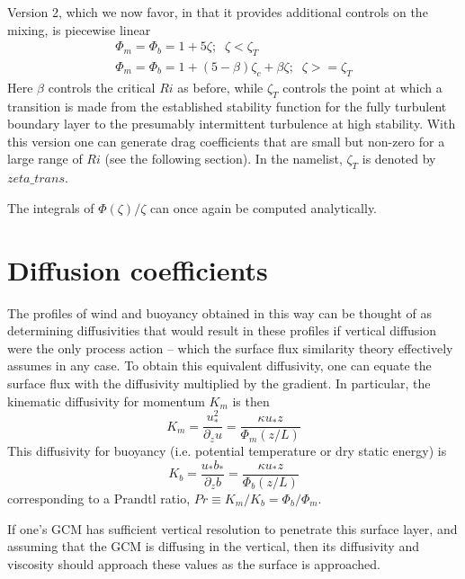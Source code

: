 \documentclass[12pt, letterpaper]{article}
\begin{document}
Version 2, which we now favor, in that it provides additional controls
on the mixing, is piecewise linear
\begin{gather}
  \Phi_m = \Phi_b = 1+5\zeta;\;\; \zeta < \zeta_T \\
  \Phi_m = \Phi_b = 1+(5-\beta)\zeta_c+\beta\zeta;\;\; \zeta >= \zeta_T
\end{gather}
Here $\beta$ controls the critical $Ri$ as before, while $\zeta_T$
controls the point at which a transition is made from the established
stability function for the fully turbulent boundary layer to the
presumably intermittent turbulence at high stability.  With this
version one can generate drag coefficients that are small but non-zero
for a large range of $Ri$ (see the following section).  In the
namelist, $\zeta_T$ is denoted by $zeta\_trans$.

The integrals of $\Phi(\zeta)/\zeta$ can once again be computed
analytically.

\section{Diffusion coefficients}

The profiles of wind and buoyancy obtained in this way can be thought
of as determining diffusivities that would result in these profiles if
vertical diffusion were the only process action -- which the surface
flux similarity theory effectively assumes in any case.  To obtain
this equivalent diffusivity, one can equate the surface flux with the
diffusivity multiplied by the gradient.  In particular, the kinematic
diffusivity for momentum $K_m$ is then
\begin{equation}
  K_m = \frac{u_*^2}{\partial_zu} = \frac{\kappa u_* z}{\Phi_m(z/L)} \label{eq:momentum}
\end{equation}
This diffusivity for buoyancy (i.e. potential temperature or dry
static energy) is
\begin{equation}
  K_b = \frac{u_*b_*}{\partial_z b} = \frac{\kappa u_* z}{\Phi_b(z/L)} \label{eq:buoyancy}
\end{equation}
corresponding to a Prandtl ratio, $Pr \equiv K_m/K_b = \Phi_b/\Phi_m$.

If one's GCM has sufficient vertical resolution to penetrate this
surface layer, and assuming that the GCM is diffusing in the vertical,
then its diffusivity and viscosity should approach these values as the
surface is approached.
\end{document}
